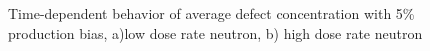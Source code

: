 \documentclass[a4paper]{article}
\begin{document}
    \begin{figure}[h!]  %
      \centering
      \qquad
      \caption{Time-dependent behavior of average defect concentration  with 5\% production bias, a)low dose rate neutron, b) high dose rate neutron}
      \label{figure:average_concentrations_neutron_5}
    \end{figure}
\end{document}
